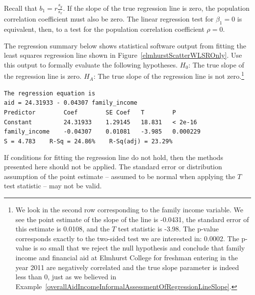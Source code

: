 Recall that $b_1=r\frac{s_y}{s_x}$.  If the slope of the true regression line is zero, the population correlation coefficient must also be zero.  The linear regression test for $\beta_1=0$ is equivalent, then, to a test for the population correlation coefficient $\rho=0$.

\begin{exercise}
The regression summary below shows statistical software output from fitting the least squares regression line shown in Figure~\ref{elmhurstScatterWLSROnly}. Use this output to formally evaluate the following hypotheses. $H_0$: The true slope of the regression line is zero. $H_A$: The true slope of the regression line is not zero.\footnote{We look in the second row corresponding to the family income variable. We see the point estimate of the slope of the line is -0.0431, the standard error of this estimate is 0.0108, and the $T$ test statistic is -3.98. The p-value corresponds exactly to the two-sided test we are interested in: 0.0002. The p-value is so small that we reject the null hypothesis and conclude that family income and financial aid at Elmhurst College for freshman entering in the year 2011 are negatively correlated and the true slope parameter is indeed less than 0, just as we believed in Example~\ref{overallAidIncomeInformalAssessmentOfRegressionLineSlope}.}
\end{exercise}

\begin{tipBox}{\texttt{The regression equation is} \\

\texttt{aid = 24.31933 - 0.04307 family\_income} \\

\texttt{Predictor \ \ \ \ \ \ \ Coef \ \ \ \ \ \ \ SE Coef \ \ T \ \ \ \ \ \ \ P} \\
\texttt{Constant \ \ \ \ \ \ \ \  24.31933 \ \ \ 1.29145 \ \ 18.831 \ \ < 2e-16} \\
\texttt{family\_income\ \ \ \ -0.04307 \ \ \ 0.01081 \ \ -3.985 \ \ 0.000229} \\

\texttt{S = 4.783\ \ \ \ R-Sq = 24.86\% \ \ \ R-Sq(adj) = 23.29\%}}
\end{tipBox}

\begin{tipBox}{
If conditions for fitting the regression line do not hold, then the methods presented here should not be applied. The standard error or distribution assumption of the point estimate -- assumed to be normal when applying the $T$ test statistic -- may not be valid.}
\end{tipBox}


